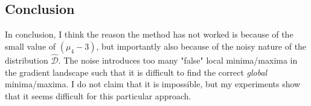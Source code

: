 \documentclass[12 pt]{article}        	%
\newcommand{\dgdi}{\widehat{\mathcal{D}}}
\begin{document}
\subsection{Conclusion}
In conclusion, I think the reason the method has not worked is because of the small value of $(\mu_4 - 3)$, but importantly also because of the noisy nature of the distribution $\dgdi$. 
The noise introduces too many "false" local minima/maxima in the gradient landscape such that it is difficult to find the correct \textit{global} minima/maxima.
I do not claim that it is impossible, but my experiments show that it seems difficult for this particular approach.


\end{document}
